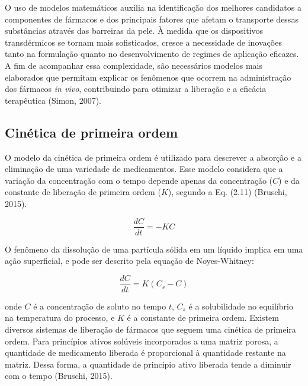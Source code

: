O uso de modelos matemáticos auxilia na identificação dos melhores candidatos a componentes de fármacos e dos principais fatores que afetam o transporte dessas substâncias através das barreiras da pele. À medida que os dispositivos transdérmicos se tornam mais sofisticados, cresce a necessidade de inovações tanto na formulação quanto no desenvolvimento de regimes de aplicação eficazes. A fim de acompanhar essa complexidade, são necessários modelos mais elaborados que permitam explicar os fenômenos que ocorrem na administração dos fármacos \textit{in vivo}, contribuindo para otimizar a liberação e a eficácia terapêutica (Simon, 2007).

\subsection{Cinética de primeira ordem}

O modelo da cinética de primeira ordem é utilizado para descrever a absorção e a eliminação de uma variedade de medicamentos. Esse modelo considera que a variação da concentração com o tempo depende apenas  da concentração ($C$) e da constante de liberação de primeira ordem ($K$), segundo a Eq. (2.11) (Bruschi, 2015). 

\begin{equation}
    \frac{dC}{dt} = -KC
\end{equation}

O fenômeno da dissolução de uma partícula sólida em um líquido implica em uma ação superficial, e pode ser descrito pela equação de Noyes-Whitney:

\begin{equation}
    \frac{dC}{dt} = K(C_s - C)
\end{equation}

\noindent onde $C$ é a concentração de soluto no tempo $t$, $C_s$ é a solubilidade no equilíbrio na temperatura do processo, e $K$ é a constante de primeira ordem. Existem diversos sistemas de liberação de fármacos que seguem uma cinética de primeira ordem. Para princípios ativos solúveis incorporados a uma matriz porosa, a quantidade de medicamento liberada é proporcional à quantidade restante na matriz. Dessa forma, a quantidade de princípio ativo liberada tende a diminuir com o tempo (Bruschi, 2015).
